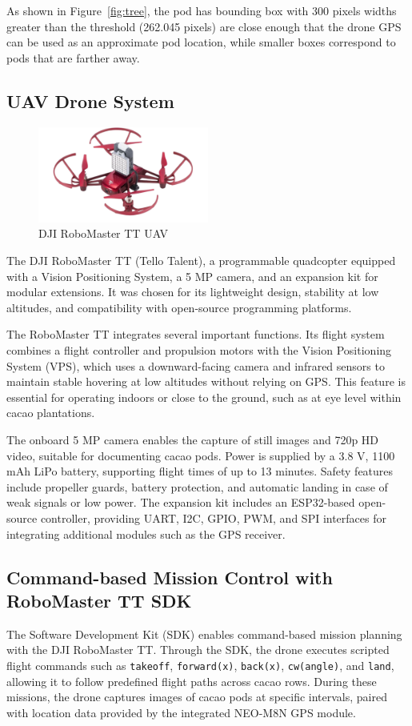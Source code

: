 As shown in Figure~\ref{fig:tree}, the pod has bounding box with 300 pixels widths greater than the threshold (262.045 pixels) are close enough that the drone GPS can be used as an approximate pod location, while smaller boxes correspond to pods that are farther away.

\subsection{UAV Drone System}

\begin{figure}[H]
	\centering
	\caption{DJI RoboMaster TT UAV}
	\label{fig:robomaster_tt}
	\includegraphics[width=0.5\textwidth]{figures/Robomaster_TT.pdf}
\end{figure}


The DJI RoboMaster TT (Tello Talent), a programmable quadcopter
equipped with a Vision Positioning System, a 5 MP camera, and an expansion kit for modular extensions.
It was chosen for its lightweight design, stability at low altitudes, and compatibility with open-source
programming platforms.

The RoboMaster TT integrates several important functions. Its flight system combines a flight controller and propulsion motors with the Vision Positioning System (VPS), which uses a downward-facing camera and infrared sensors to maintain stable hovering at low altitudes without relying on GPS. This feature is essential for operating indoors or close to the ground, such as at eye level within cacao plantations.

The onboard 5 MP camera enables the capture of still images and 720p HD video, suitable for documenting cacao pods. Power is supplied by a 3.8 V, 1100 mAh LiPo battery, supporting flight times of up to
13 minutes. Safety features include propeller guards, battery protection, and automatic landing in case of weak signals or low power. The expansion kit includes an ESP32-based open-source controller, providing UART, I2C, GPIO, PWM, and SPI interfaces for integrating additional modules such as the GPS receiver.

\subsection*{Command-based Mission Control with RoboMaster TT SDK}
The Software Development Kit (SDK) enables command-based mission planning with the DJI RoboMaster TT. Through the SDK, the drone executes scripted flight commands such as \texttt{takeoff}, \texttt{forward(x)}, \texttt{back(x)}, \texttt{cw(angle)}, and \texttt{land}, allowing it to follow predefined flight paths across cacao rows. During these missions, the drone captures images of cacao pods at specific intervals, paired with location data provided by the integrated NEO-M8N GPS module.
